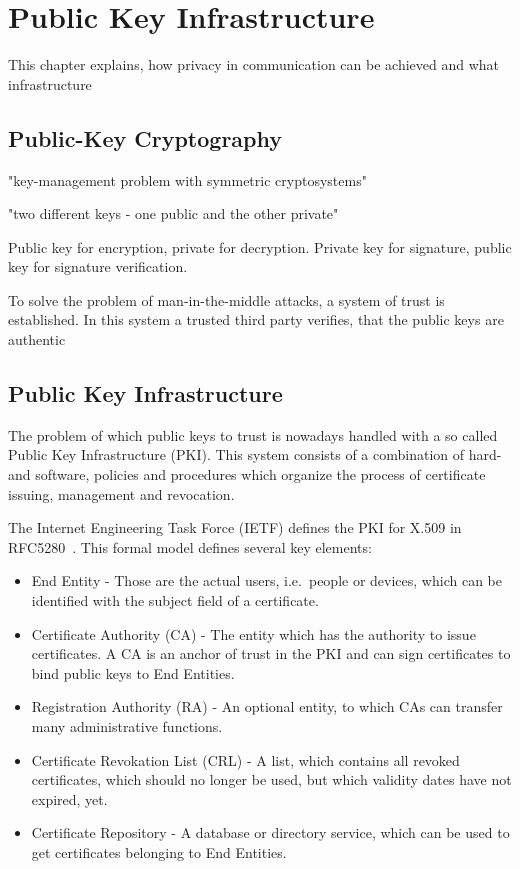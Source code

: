 \chapter{Public Key Infrastructure}\label{ch:publicKeyInfrastructure}

This chapter explains, how privacy in communication can be achieved and what infrastructure

\section{Public-Key Cryptography}\label{sec:publicKeyCryptography}

"key-management problem with symmetric cryptosystems"

"two different keys - one public and the other private"~\cite{schneier2007applied, diffie1976new}

Public key for encryption, private for decryption.
Private key for signature, public key for signature verification.

To solve the problem of man-in-the-middle attacks, a system of trust is established.
In this system a trusted third party verifies, that the public keys are authentic

\section{Public Key Infrastructure}\label{sec:publicKeyInfrastructure}
The problem of which public keys to trust is nowadays handled with a so called Public Key Infrastructure (PKI).
This system consists of a combination of hard- and software, policies and procedures which organize the process of
certificate issuing, management and revocation.

The Internet Engineering Task Force (IETF) defines the PKI for X.509 in RFC5280~\cite{RFC5280}.
This formal model defines several key elements:
\begin{itemize}
    \item End Entity - Those are the actual users, i.e.\ people or devices, which can be identified with the subject
    field of a certificate.
    \item Certificate Authority (CA) - The entity which has the authority to issue certificates.
    A CA is an anchor of trust in the PKI and can sign certificates to bind public keys to End Entities.
    \item Registration Authority (RA) - An optional entity, to which CAs can transfer many administrative functions.
    \item Certificate Revokation List (CRL) - A list, which contains all revoked certificates, which should no longer be
    used, but which validity dates have not expired, yet.
    \item Certificate Repository - A database or directory service, which can be used to get certificates belonging to
    End Entities.
\end{itemize}

